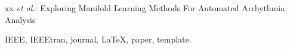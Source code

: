 \documentclass[journal]{IEEEtran}
\begin{document}
\markboth{}%
{xx \MakeLowercase{\textit{et al.}}: Exploring Manifold Learning Methods For Automated Arrhythmia Analysis}
% 











\maketitle

\begin{abstract}
\lipsum[1]
\lipsum[1]
\end{abstract}

\begin{IEEEkeywords}
IEEE, IEEEtran, journal, \LaTeX, paper, template.
\end{IEEEkeywords}






%
\IEEEpeerreviewmaketitle
\end{document}
